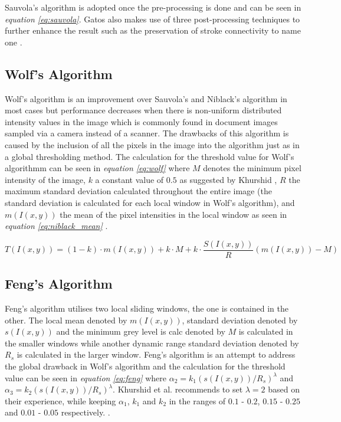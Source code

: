 \documentclass[11pt]{article}
\begin{document}
				Sauvola's algorithm is adopted once the pre-processing is done and can be seen in \textit{equation \ref{eq:sauvola}}. Gatos also makes use of three post-processing techniques to further enhance the result such as the preservation of stroke connectivity to name one \cite{pai2010adaptive}.

  		\subsection{Wolf's Algorithm}
  			Wolf's algorithm \cite{wolf2004extraction} is an improvement over Sauvola's and Niblack's algorithm in most cases but performance decreases when there is non-uniform distributed intensity values in the image which is commonly found in document images sampled via a camera instead of a scanner. The drawbacks of this algorithm is caused by the inclusion of all the pixels in the image into the algorithm just as in a global thresholding method. The calculation for the threshold value for Wolf's algorithmm can be seen in \textit{equation \ref{eq:wolf}} where $M$ denotes the minimum pixel intensity of the image, $k$ a constant value of $0.5$ as suggested by Khurshid \cite{khurshid2009comparison}, $R$ the maximum standard deviation calculated throughout the entire image (the standard deviation is calculated for each local window in Wolf's algorithm), and $m(I(x, y))$ the mean of the pixel intensities in the local window as seen in \textit{equation \ref{eq:niblack_mean}} \cite{khurshid2009comparison}.

				\begin{large}
				\begin{equation} \label{eq:wolf}
					T(I(x, y)) = (1 - k) \cdot m(I(x, y)) + k \cdot M + k \cdot \frac{S(I(x, y))}{R}(m(I(x, y)) - M)
				\end{equation}
				\end{large}

  		\subsection{Feng's Algorithm}%
  			Feng's algorithm \cite{feng2004contrast} utilises two local sliding windows, the one is contained in the other. The local mean denoted by $m(I(x, y))$, standard deviation denoted by $s(I(x, y))$ and the minimum grey level is calc denoted by $M$ is calculated in the smaller windows while another dynamic range standard deviation denoted by $R_s$ is calculated in the larger window. Feng's algorithm is an attempt to address the global drawback in Wolf's algorithm and the calculation for the threshold value can be seen in \textit{equation \ref{eq:feng}} where $\alpha_2 = k_1(s(I(x, y))/R_s)^\lambda$ and $\alpha_3 = k_2(s(I(x, y))/R_s)^\lambda$. Khurshid et al. recommends to set $\lambda=2$ based on their experience, while keeping $\alpha_1$, $k_1$ and $k_2$ in the ranges \sloppy of $0.1$ - $0.2$, $0.15$ - $0.25$ and $0.01$ - $0.05$ respectively. \cite{khurshid2009comparison}.
\end{document}
